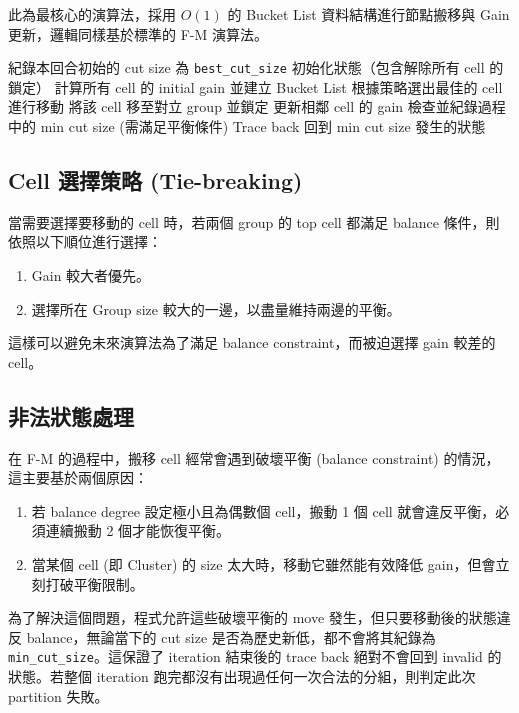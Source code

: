 \documentclass[12pt]{article}
\begin{document}
此為最核心的演算法，採用 $O(1)$ 的 Bucket List 資料結構進行節點搬移與 Gain 更新，邏輯同樣基於標準的 F-M 演算法。

\begin{algorithm}[H]
\caption{Fiduccia-Mattheyses Partitioning}
\begin{algorithmic}[1]
\Repeat
    \State 紀錄本回合初始的 cut size 為 \texttt{best\_cut\_size}
    \State 初始化狀態（包含解除所有 cell 的鎖定）
    \State 計算所有 cell 的 initial gain 並建立 Bucket List
        \State 根據策略選出最佳的 cell 進行移動
        \State 將該 cell 移至對立 group 並鎖定
        \State 更新相鄰 cell 的 gain
        \State 檢查並紀錄過程中的 min cut size (需滿足平衡條件)
    \EndWhile
    \State Trace back 回到 min cut size 發生的狀態
\end{algorithmic}
\end{algorithm}

\subsection{Cell 選擇策略 (Tie-breaking)}
當需要選擇要移動的 cell 時，若兩個 group 的 top cell 都滿足 balance 條件，則依照以下順位進行選擇：
\begin{enumerate}
    \item Gain 較大者優先。
    \item 選擇所在 Group size 較大的一邊，以盡量維持兩邊的平衡。
\end{enumerate}
這樣可以避免未來演算法為了滿足 balance constraint，而被迫選擇 gain 較差的 cell。

\subsection{非法狀態處理}
在 F-M 的過程中，搬移 cell 經常會遇到破壞平衡 (balance constraint) 的情況，這主要基於兩個原因：
\begin{enumerate}
    \item 若 balance degree 設定極小且為偶數個 cell，搬動 1 個 cell 就會違反平衡，必須連續搬動 2 個才能恢復平衡。
    \item 當某個 cell (即 Cluster) 的 size 太大時，移動它雖然能有效降低 gain，但會立刻打破平衡限制。
\end{enumerate}
為了解決這個問題，程式允許這些破壞平衡的 move 發生，但只要移動後的狀態違反 balance，無論當下的 cut size 是否為歷史新低，都不會將其紀錄為 \texttt{min\_cut\_size}。這保證了 iteration 結束後的 trace back 絕對不會回到 invalid 的狀態。若整個 iteration 跑完都沒有出現過任何一次合法的分組，則判定此次 partition 失敗。
\end{document}
